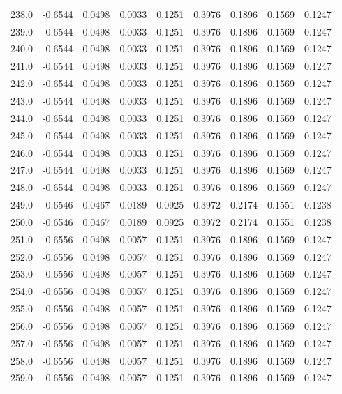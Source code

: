 \begin{longtable}{lrrrrrrrr}
238.0 & -0.6544 & 0.0498 & 0.0033 & 0.1251 & 0.3976 & 0.1896 & 0.1569 & 0.1247 \\
239.0 & -0.6544 & 0.0498 & 0.0033 & 0.1251 & 0.3976 & 0.1896 & 0.1569 & 0.1247 \\
240.0 & -0.6544 & 0.0498 & 0.0033 & 0.1251 & 0.3976 & 0.1896 & 0.1569 & 0.1247 \\
241.0 & -0.6544 & 0.0498 & 0.0033 & 0.1251 & 0.3976 & 0.1896 & 0.1569 & 0.1247 \\
242.0 & -0.6544 & 0.0498 & 0.0033 & 0.1251 & 0.3976 & 0.1896 & 0.1569 & 0.1247 \\
243.0 & -0.6544 & 0.0498 & 0.0033 & 0.1251 & 0.3976 & 0.1896 & 0.1569 & 0.1247 \\
244.0 & -0.6544 & 0.0498 & 0.0033 & 0.1251 & 0.3976 & 0.1896 & 0.1569 & 0.1247 \\
245.0 & -0.6544 & 0.0498 & 0.0033 & 0.1251 & 0.3976 & 0.1896 & 0.1569 & 0.1247 \\
246.0 & -0.6544 & 0.0498 & 0.0033 & 0.1251 & 0.3976 & 0.1896 & 0.1569 & 0.1247 \\
247.0 & -0.6544 & 0.0498 & 0.0033 & 0.1251 & 0.3976 & 0.1896 & 0.1569 & 0.1247 \\
248.0 & -0.6544 & 0.0498 & 0.0033 & 0.1251 & 0.3976 & 0.1896 & 0.1569 & 0.1247 \\
249.0 & -0.6546 & 0.0467 & 0.0189 & 0.0925 & 0.3972 & 0.2174 & 0.1551 & 0.1238 \\
250.0 & -0.6546 & 0.0467 & 0.0189 & 0.0925 & 0.3972 & 0.2174 & 0.1551 & 0.1238 \\
251.0 & -0.6556 & 0.0498 & 0.0057 & 0.1251 & 0.3976 & 0.1896 & 0.1569 & 0.1247 \\
252.0 & -0.6556 & 0.0498 & 0.0057 & 0.1251 & 0.3976 & 0.1896 & 0.1569 & 0.1247 \\
253.0 & -0.6556 & 0.0498 & 0.0057 & 0.1251 & 0.3976 & 0.1896 & 0.1569 & 0.1247 \\
254.0 & -0.6556 & 0.0498 & 0.0057 & 0.1251 & 0.3976 & 0.1896 & 0.1569 & 0.1247 \\
255.0 & -0.6556 & 0.0498 & 0.0057 & 0.1251 & 0.3976 & 0.1896 & 0.1569 & 0.1247 \\
256.0 & -0.6556 & 0.0498 & 0.0057 & 0.1251 & 0.3976 & 0.1896 & 0.1569 & 0.1247 \\
257.0 & -0.6556 & 0.0498 & 0.0057 & 0.1251 & 0.3976 & 0.1896 & 0.1569 & 0.1247 \\
258.0 & -0.6556 & 0.0498 & 0.0057 & 0.1251 & 0.3976 & 0.1896 & 0.1569 & 0.1247 \\
259.0 & -0.6556 & 0.0498 & 0.0057 & 0.1251 & 0.3976 & 0.1896 & 0.1569 & 0.1247 \\

\end{longtable}
